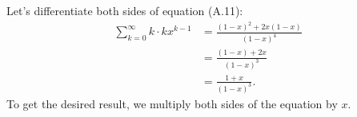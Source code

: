 Let's differentiate both sides of equation (A.11):
\begin{align*}
    \sum_{k=0}^\infty k\cdot kx^{k-1} &= \frac{(1-x)^2+2x(1-x)}{(1-x)^4} \\
    &= \frac{(1-x)+2x}{(1-x)^3} \\[1mm]
    &= \frac{1+x}{(1-x)^3}.
\end{align*}
To get the desired result, we multiply both sides of the equation by $x$.
